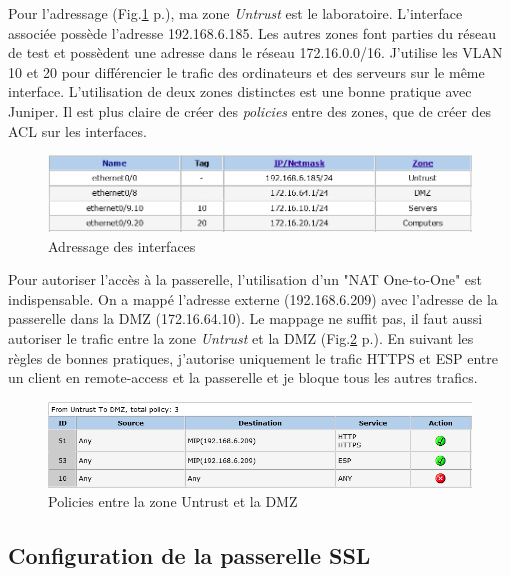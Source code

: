 Pour l'adressage (Fig.\ref{fig:ifJuniper} p.\pageref{fig:ifJuniper}), ma zone \textit{Untrust} est le laboratoire. 
L'interface associée possède l'adresse 192.168.6.185.
Les autres zones font parties du réseau de test et possèdent une adresse dans le réseau 172.16.0.0/16.
J'utilise les VLAN 10 et 20 pour différencier le trafic des ordinateurs et des serveurs sur le même interface.
L'utilisation de deux zones distinctes est une bonne pratique avec Juniper. 
Il est plus claire de créer des \textit{policies} entre des zones, que de créer des ACL sur les interfaces.
\begin{figure}[ht]
	\centering
	\includegraphics[width=16cm]{juniper/interfaces.png}
	\caption{Adressage des interfaces}
	\label{fig:ifJuniper}
\end{figure}

Pour autoriser l'accès à la passerelle, l'utilisation d'un "NAT One-to-One" est indispensable.
On a mappé l'adresse externe (192.168.6.209) avec l'adresse de la passerelle dans la DMZ (172.16.64.10).
Le mappage ne suffit pas, il faut aussi autoriser le trafic entre la zone \textit{Untrust} et la DMZ (Fig.\ref{fig:polUnDMZ} p.\pageref{fig:polUnDMZ}).
En suivant les règles de bonnes pratiques, j'autorise uniquement le trafic HTTPS et ESP entre un client en remote-access et la passerelle et je bloque tous les autres trafics.
\begin{figure}[ht]
	\centering
	\includegraphics[width=16cm]{juniper/Policy-Untrust-DMZ.png}
	\caption{Policies entre la zone Untrust et la DMZ}
	\label{fig:polUnDMZ}
\end{figure}

\subsection{Configuration de la passerelle  SSL}

